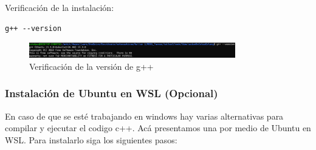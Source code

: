 \documentclass{article}
\begin{document}
Verificación de la instalación:
\begin{verbatim}
g++ --version
\end{verbatim}

\begin{figure}[H]
    \centering
    \includegraphics[width=0.8\textwidth]{images/manualUsuarioErlangBC_2.png}
    \caption{Verificación de la versión de g++}
    \label{fig:version}
\end{figure}

\subsubsection{Instalación de Ubuntu en WSL (Opcional)}
En caso de que se esté trabajando en windows hay varias alternativas para compilar y ejecutar el codigo c++. Acá presentamos una por medio de Ubuntu en WSL. Para instalarlo siga los siguientes pasos:
\end{document}
